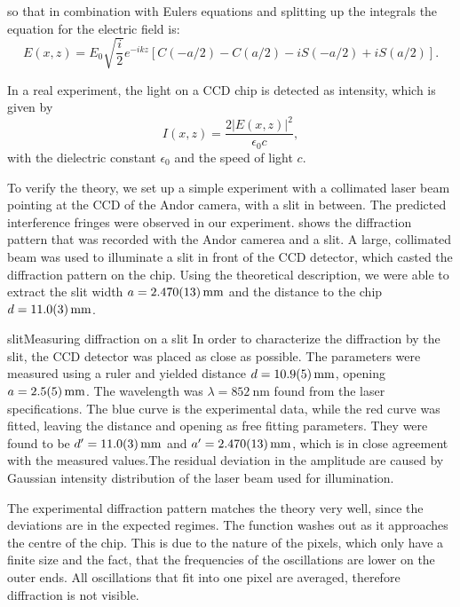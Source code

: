 so that in combination with Eulers equations and splitting up the integrals the equation for the electric field is:
\begin{equation}
E(x,z) = E_0 \sqrt{\frac{i}{2}} e^{-ikz} \left [ C(-a/2) - C(a/2) - iS(-a/2) + iS(a/2) \right ].
\end{equation}

In a real experiment, the light on a CCD chip is detected as intensity, which is given by
\begin{equation}
I(x,z) = \frac{2 \lvert E(x,z) \rvert ^2}{\epsilon_0 c} ,
\end{equation}
with the dielectric constant $\epsilon_0$ and the speed of light $c$.

To verify the theory, we set up a simple experiment with a collimated laser beam pointing at the CCD of the Andor camera, with a slit in between. The predicted interference fringes were observed in our experiment.  shows the diffraction pattern that was recorded with the Andor camerea and a slit. A large, collimated beam was used to illuminate a slit in front of the CCD detector, which casted the diffraction pattern on the chip. Using the theoretical description, we were able to extract the slit width $a=\SI{2.470\pm0.013}{\milli\meter}$ and the distance to the chip $d=\SI{11.0\pm0.3}{\milli\meter}$.

\pltCustom{
	\begin{center}
		
		
	\end{center}
}
{slit}{Measuring diffraction on a slit}{
	In order to characterize the diffraction by the slit, the CCD detector was placed as close as possible. The parameters were measured using a ruler and yielded distance $d=\SI{10.9\pm0.5}{\milli\meter}$, opening $a=\SI{2.5\pm0.5}{\milli\meter}$. The wavelength was $\lambda =\SI{852}{\nano\meter}$ found from the laser specifications. The blue curve is the experimental data, while the red curve was fitted, leaving the distance and opening as free fitting parameters. They were found to be $d^\prime=\SI{11.0\pm0.3}{\milli\meter}$ and $a^\prime=\SI{2.470\pm0.013}{\milli\meter}$, which is in close agreement with the measured values.The residual deviation in the amplitude are caused by Gaussian intensity distribution of the laser beam used for illumination.
}

The experimental diffraction pattern matches the theory very well, since the deviations are in the expected regimes.
The function washes out as it approaches the centre of the chip. This is due to the nature of the pixels, which only have a finite size and the fact, that the frequencies of the oscillations are lower on the outer ends. All oscillations that fit into one pixel are averaged, therefore diffraction is not visible.

